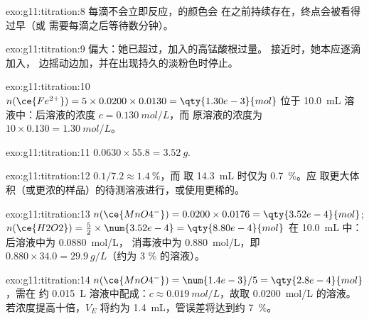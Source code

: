 \begin{solution}{exo:g11:titration:8}
每滴不会立即反应，的颜色会
在之前持续存在，终点会被看得过早（或
需要每滴之后等待数分钟）。
\end{solution}

\begin{solution}{exo:g11:titration:9}
偏大：她已超过，加入的高锰酸根过量。
接近时，她本应逐滴加入，
边摇动边加，并在出现持久的淡粉色时停止。
\end{solution}

\begin{solution}{exo:g11:titration:10}
$n(\ce{Fe^{2+}}) = 5 \times 0.0200 \times 0.0130 = \qty{1.30e-3}{mol}$ 位于
\qty{10.0}{mL} 溶液中：后溶液的浓度 $c = \qty{0.130}{mol/L}$，而
原溶液的浓度为 $10 \times 0.130 = \qty{1.30}{mol/L}$。
\end{solution}

\begin{solution}{exo:g11:titration:11}
$0.0630 \times 55.8 = \qty{3.52}{g}$.
\end{solution}

\begin{solution}{exo:g11:titration:12}
$0.1 / 7.2 \approx \qty{1.4}{\percent}$，而
取 \qty{14.3}{mL} 时仅为 \qty{0.7}{\percent}。应
取更大体积（或更浓的样品）的待测溶液进行，或使用更稀的。
\end{solution}

\begin{solution}{exo:g11:titration:13}
$n(\ce{MnO4^-}) = 0.0200 \times 0.0176 = \qty{3.52e-4}{mol}$;
$n(\ce{H2O2}) = \frac{5}{2} \times \num{3.52e-4} = \qty{8.80e-4}{mol}$ 在
\qty{10.0}{mL} 中：后溶液中为 \qty{0.0880}{mol/L}，
消毒液中为 \qty{0.880}{mol/L}，即
$0.880 \times 34.0 = \qty{29.9}{g/L}$（约为 3 \% 的溶液）。
\end{solution}

\begin{solution}{exo:g11:titration:14}
$n(\ce{MnO4^-}) = \num{1.4e-3} / 5 = \qty{2.8e-4}{mol}$，需在
约 \qty{0.015}{L} 溶液中配成：$c \approx \qty{0.019}{mol/L}$，故取
\qty{0.0200}{mol/L} 的溶液。若浓度提高十倍，$V_E$ 将约为
\qty{1.4}{mL}，管误差将达到约
\qty{7}{\percent}。
\end{solution}

